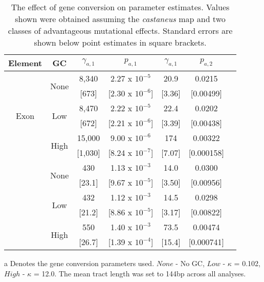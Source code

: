 \begin{table}
   \centering
      \begin{threeparttable}[b]

\caption{The effect of gene conversion on parameter estimates. Values shown were obtained assuming the \textit{castaneus} map and two classes of advantageous mutational effects. Standard errors are shown below point estimates in square brackets.}

\begin{tabular}{ccccccc}

\toprule
Element 		&      GC\tnote{a}  &          $\gamma_{a,1}$ &            $p_{a,1}$ &       $\gamma_{a,1}$ &      $p_{a,2}$ \\
\midrule
   \multirow{6}{*}{Exon} &    \multirow{2}{*}{None} &   8,340&  2.27 x $10^{-5}$ &   20.9&  0.0215\\
             &      &    [673]&  [2.30 x $10^{-6}$]&    [3.36]&  [0.00499]          \\
 	      	 &  \multirow{2}{*}{Low}  &   8,470 &  2.22 x $10^{-5}$ &   22.4&  0.0202\\
             &      &    [672]&  [2.21 x $10^{-6}$]&    [3.39]&  [0.00438]\\
   		     &    \multirow{2}{*}{High}  &  15,000 &  9.00 x $10^{-6}$ &  174&  0.00322\\
             &      &   [1,030] &  [8.24 x $10^{-7}$] &    [7.07] &  [0.000158]          \\ \hdashline
    \multirow{6}{*}{CNE}		 &    \multirow{2}{*}{None}  &    430&  1.13 x $10^{-3}$ &   14.0&  0.0300\\
             &      &     [23.1] &  [9.67 x $10^{-5}$] &    [3.50] &  [0.00956]      \\
     		 &  \multirow{2}{*}{Low}  &    432 &  1.12 x $10^{-3}$ &   14.5&  0.0298\\
             &      &     [21.2]&  [8.86 x $10^{-5}$] &    [3.17] &  [0.00822]\\
     		&    \multirow{2}{*}{High}  &    550 &  1.40 x $10^{-3}$ &   73.5&  0.00474          \\
            &      &     [26.7] &  [1.39 x $10^{-4}$] &   [15.4] &  [0.000741]          \\
\bottomrule
\end{tabular}

   \begin{tablenotes}
     \item[a] Denotes the gene conversion parameters used. $None$ - No GC, $Low$ - $\kappa$ = 0.102, $High$ - $\kappa$ = 12.0. The mean tract length was set to 144bp across all analyses.
   \end{tablenotes}
  \label{tab:GeneConversion}

    \end{threeparttable}

\end{table}